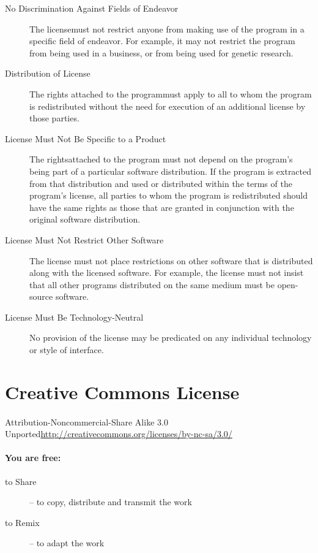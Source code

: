\begin{appendices}
\begin{description}
\item[No Discrimination Against Fields of Endeavor]{The license\linebreak must not restrict anyone from making use of the program in a specific field of endeavor. For example, it may not restrict the program from being used in a business, or from being used for genetic research.}
\item[Distribution of License]{The rights attached to the program\linebreak must apply to all to whom the program is redistributed without the need for execution of an additional license by those parties.}
\item[License Must Not Be Specific to a Product]{The rights\linebreak attached to the program must not depend on the program's being part of a particular software distribution. If the program is extracted from that distribution and used or distributed within the terms of the program's license, all parties to whom the program is redistributed should have the same rights as those that are granted in conjunction with the original software distribution.}
\item[License Must Not Restrict Other Software]{The license must not place restrictions on other software that is distributed along with the licensed software. For example, the license must not insist that all other programs distributed on the same medium must be open-source software.}
\item[License Must Be Technology-Neutral]{No provision of the license may be predicated on any individual technology or style of interface.}
\end{description}
\newpage
\section{Creative Commons License}
\paragraph{}Attribution-Noncommercial-Share Alike 3.0 Unported\linebreak\url{http://creativecommons.org/licenses/by-nc-sa/3.0/}
\paragraph{You are free:}
\begin{description}
\item[to Share]{-- to copy, distribute and transmit the work}
\item[to Remix]{-- to adapt the work}
\end{description}

\end{appendices}
